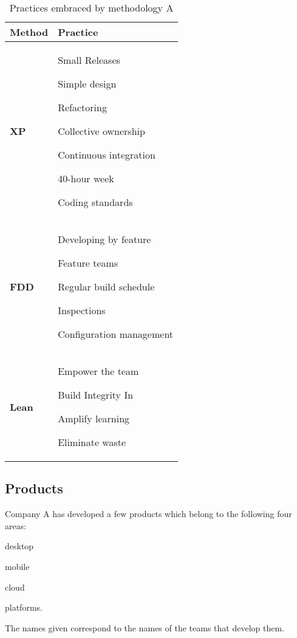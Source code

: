 \begin{table} [H]
\caption{Practices embraced by methodology A}
\begin{tabular}{| p{2cm} | p{13cm}|}
    \hline
     \textbf{Method} & \textbf{Practice} \\ \hline
     \textbf{XP}  & \begin{inparaenum} [a\upshape)]
     				\item Small Releases \item Simple design \item Refactoring \item Collective ownership \item Continuous integration \item 40-hour week \item Coding standards
					\end{inparaenum}      \\ \hline
     \textbf{FDD}  & \begin{inparaenum} [a\upshape)]  \item Developing by feature \item Feature teams \item Regular build schedule \item Inspections \item Configuration management
     				  \end{inparaenum}\\ \hline
     \textbf{Lean} & \begin{inparaenum} [a\upshape)] \item Empower the team \item Build Integrity In \item Amplify learning \item Eliminate waste
     				 \end{inparaenum} \\ \hline
\end{tabular}
\label{table:methodologyA_practices}
\end{table}

\subsection{Products}
Company A has developed a few products which belong to the following four areas: 
\begin{inparaenum} [a\upshape)]
\item desktop
\item mobile
\item cloud
\item platforms.
\end{inparaenum}
The names given correspond to the names of the teams that develop them.


